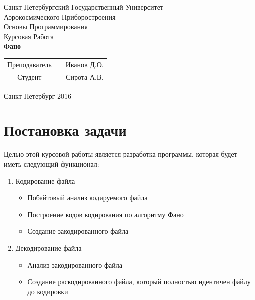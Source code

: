 \documentclass{article}
\begin{document}
\begin{center}
  \Large{Санкт-Петербургский Государственный Университет\\
  Аэрокосмического Приборостроения}\\
  \vspace{6cm}
  \large{Основы Программирования}\\
  \vspace{2cm}
  \LARGE{Курсовая Работа}\\
  
  \vspace{1cm}
  \textbf{ Фано}\\
  \vspace{5cm}
\end{center}


\vspace{1em}
\begin{tabular}{ccc}
  Преподаватель & \hspace{8cm} & Иванов Д.О.\\
  Студент & \hspace{9.5cm} & Сирота А.В. 
\end{tabular}

\vspace{1em}

\vfill
\begin{center}
Санкт-Петербург 2016
\end{center}

\newpage

\pagestyle{plain}
\tableofcontents 

\newpage
\section {Постановка задачи}


Целью этой курсовой работы является разработка программы, которая будет иметь следующий функционал:

\begin{enumerate}
  \item Кодирование файла
  
  \begin{itemize}
    \item Побайтовый анализ кодируемого файла
    \item Построение кодов кодирования по алгоритму Фано
    \item Создание закодированного файла
  \end{itemize}
  
  \item Декодирование файла
  
  \begin{itemize}
    \item Анализ закодированного файла
    \item Создание раскодированного файла, который полностью идентичен файлу до кодировки
  \end{itemize}
\end{enumerate}
\end{document}
